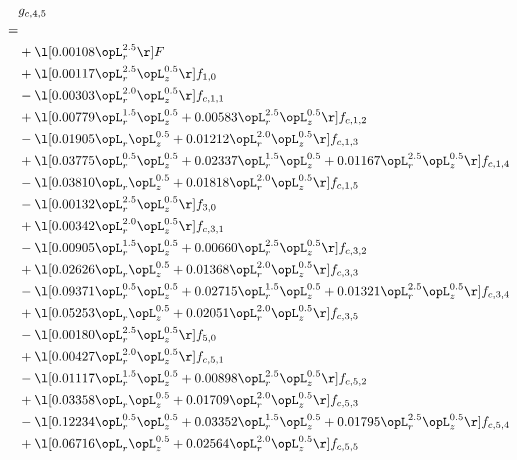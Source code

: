 \begin{alignat}{2} 
\label{eq:g_45_0} 
& g_{c,4,5} \nonumber \\ 
 = \\ 
& + \l[  0.00108 \opL_r^{2.5}  \r] F \nonumber \\ 
& + \l[  0.00117 \opL_r^{2.5} \opL_z^{0.5}  \r] f_{1,0} \nonumber \\ 
& - \l[  0.00303 \opL_r^{2.0} \opL_z^{0.5}  \r] f_{c,1,1} \nonumber \\ 
& + \l[  0.00779 \opL_r^{1.5} \opL_z^{0.5} +  0.00583 \opL_r^{2.5} \opL_z^{0.5}  \r] f_{c,1,2} \nonumber \\ 
& - \l[  0.01905 \opL_r \opL_z^{0.5} +  0.01212 \opL_r^{2.0} \opL_z^{0.5}  \r] f_{c,1,3} \nonumber \\ 
& + \l[  0.03775 \opL_r^{0.5} \opL_z^{0.5} +  0.02337 \opL_r^{1.5} \opL_z^{0.5} +  0.01167 \opL_r^{2.5} \opL_z^{0.5}  \r] f_{c,1,4} \nonumber \\ 
& - \l[  0.03810 \opL_r \opL_z^{0.5} +  0.01818 \opL_r^{2.0} \opL_z^{0.5}  \r] f_{c,1,5} \nonumber \\ 
& - \l[  0.00132 \opL_r^{2.5} \opL_z^{0.5}  \r] f_{3,0} \nonumber \\ 
& + \l[  0.00342 \opL_r^{2.0} \opL_z^{0.5}  \r] f_{c,3,1} \nonumber \\ 
& - \l[  0.00905 \opL_r^{1.5} \opL_z^{0.5} +  0.00660 \opL_r^{2.5} \opL_z^{0.5}  \r] f_{c,3,2} \nonumber \\ 
& + \l[  0.02626 \opL_r \opL_z^{0.5} +  0.01368 \opL_r^{2.0} \opL_z^{0.5}  \r] f_{c,3,3} \nonumber \\ 
& - \l[  0.09371 \opL_r^{0.5} \opL_z^{0.5} +  0.02715 \opL_r^{1.5} \opL_z^{0.5} +  0.01321 \opL_r^{2.5} \opL_z^{0.5}  \r] f_{c,3,4} \nonumber \\ 
& + \l[  0.05253 \opL_r \opL_z^{0.5} +  0.02051 \opL_r^{2.0} \opL_z^{0.5}  \r] f_{c,3,5} \nonumber \\ 
& - \l[  0.00180 \opL_r^{2.5} \opL_z^{0.5}  \r] f_{5,0} \nonumber \\ 
& + \l[  0.00427 \opL_r^{2.0} \opL_z^{0.5}  \r] f_{c,5,1} \nonumber \\ 
& - \l[  0.01117 \opL_r^{1.5} \opL_z^{0.5} +  0.00898 \opL_r^{2.5} \opL_z^{0.5}  \r] f_{c,5,2} \nonumber \\ 
& + \l[  0.03358 \opL_r \opL_z^{0.5} +  0.01709 \opL_r^{2.0} \opL_z^{0.5}  \r] f_{c,5,3} \nonumber \\ 
& - \l[  0.12234 \opL_r^{0.5} \opL_z^{0.5} +  0.03352 \opL_r^{1.5} \opL_z^{0.5} +  0.01795 \opL_r^{2.5} \opL_z^{0.5}  \r] f_{c,5,4} \nonumber \\ 
& + \l[  0.06716 \opL_r \opL_z^{0.5} +  0.02564 \opL_r^{2.0} \opL_z^{0.5}  \r] f_{c,5,5} \nonumber \\ 
\end{alignat} 


